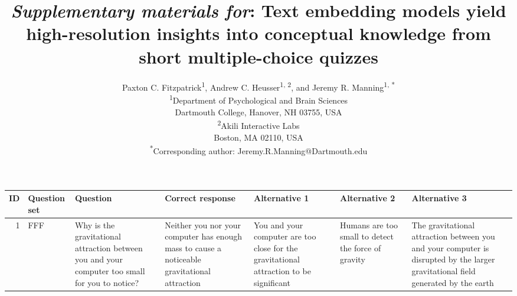 \documentclass[10pt]{article}
\title{\textit{Supplementary materials for}: Text embedding models yield 
high-resolution insights into conceptual knowledge from short multiple-choice
quizzes}
\author{Paxton C. Fitzpatrick\textsuperscript{1},
Andrew C. Heusser\textsuperscript{1, 2}, and Jeremy R.
Manning\textsuperscript{1, *}\\\small{\textsuperscript{1}Department of Psychological and Brain Sciences}\\\small{Dartmouth College, Hanover, NH 03755, USA}\\\small{\textsuperscript{2}Akili Interactive Labs}\\\small{Boston, MA 02110, USA}\\\small{\textsuperscript{*}Corresponding author:
Jeremy.R.Manning@Dartmouth.edu}}
\date{}
\begin{document}
\renewcommand{\figurename}{Supplementary Figure}
\renewcommand{\tablename}{Supplementary Table}


\setcounter{equation}{0}
\setcounter{figure}{0}
\setcounter{table}{0}
\setcounter{page}{1}
\setcounter{section}{0}
\makeatletter


\begin{titlepage}
\maketitle
\end{titlepage}


\begin{tiny}
\renewcommand*{\arraystretch}{1.4}
\begin{longtable}{|r|p{0.375in}|p{1.275in}|p{0.75in}|p{0.75in}|p{0.75in}|p{0.75in}|}
\hline
    \textbf{ID} & \textbf{Question set} &                                                                                                                                                                                                                                                                         \textbf{Question} &                                                                                                                                     \textbf{Correct response} &                                                                                                     \textbf{Alternative 1} &                                                                                                                          \textbf{Alternative 2} &                                                                                                                                 \textbf{Alternative 3} \\\hline
    1     &     FFF &                                                                                                                                                                                   Why is the gravitational attraction between you and your computer too small for you to notice? &                                           Neither you nor your computer has enough mass to cause a noticeable gravitational attraction &                You and your computer are too close for the gravitational attraction to be significant &                                                                        Humans are too small to detect the force of gravity &  The gravitational attraction between you and your computer is disrupted by the larger gravitational field generated by the earth \\\hline

\end{longtable}
\end{tiny}
\end{document}

